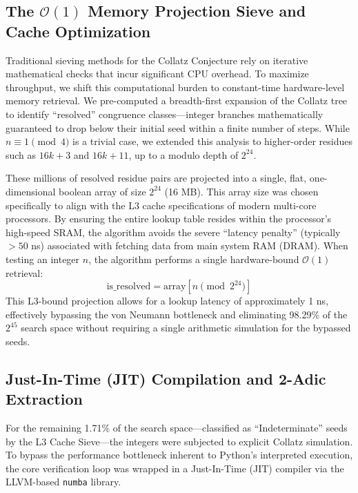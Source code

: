 \documentclass[11pt, a4paper]{article}
\theoremstyle{definition}
\begin{document}
\subsection{The \texorpdfstring{$\mathcal{O}(1)$}{O(1)} Memory Projection Sieve and Cache Optimization}

Traditional sieving methods for the Collatz Conjecture rely on iterative mathematical checks that incur significant CPU overhead. To maximize throughput, we shift this computational burden to constant-time hardware-level memory retrieval. We pre-computed a breadth-first expansion of the Collatz tree to identify ``resolved'' congruence classes—integer branches mathematically guaranteed to drop below their initial seed within a finite number of steps. While $n \equiv 1 \pmod{4}$ is a trivial case, we extended this analysis to higher-order residues such as $16k+3$ and $16k+11$, up to a modulo depth of $2^{24}$.

These millions of resolved residue pairs are projected into a single, flat, one-dimensional boolean array of size $2^{24}$ (16 MB). This array size was chosen specifically to align with the L3 cache specifications of modern multi-core processors. By ensuring the entire lookup table resides within the processor's high-speed SRAM, the algorithm avoids the severe ``latency penalty'' (typically $>50$ ns) associated with fetching data from main system RAM (DRAM). When testing an integer $n$, the algorithm performs a single hardware-bound $\mathcal{O}(1)$ retrieval: 
\begin{equation}
\text{is\_resolved} = \text{array}[n \pmod{2^{24}}]
\end{equation}
This L3-bound projection allows for a lookup latency of approximately 1 ns, effectively bypassing the von Neumann bottleneck and eliminating 98.29\% of the $2^{45}$ search space without requiring a single arithmetic simulation for the bypassed seeds.

\subsection{Just-In-Time (JIT) Compilation and 2-Adic Extraction}

For the remaining 1.71\% of the search space---classified as ``Indeterminate'' seeds by the L3 Cache Sieve---the integers were subjected to explicit Collatz simulation. To bypass the performance bottleneck inherent to Python's interpreted execution, the core verification loop was wrapped in a Just-In-Time (JIT) compiler via the LLVM-based \texttt{numba} library.
\end{document}
